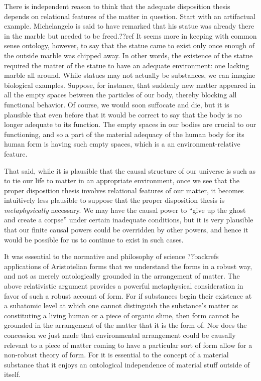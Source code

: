 There is independent reason to think that the adequate disposition thesis depends on relational features of the matter in 
question. Start with an artifactual example. Michelangelo is said to have remarked that his statue was already there in the 
marble but needed to be freed.??ref It seems more in keeping with common sense ontology, however, to say that the statue came 
to exist only once enough of the outside marble was chipped away. In other words, the existence of the statue required the 
matter of the statue to have an adequate environment: one lacking marble all around. While statues may not actually be substances,
we can imagine biological examples. Suppose, for instance, that suddenly new matter appeared in all the empty spaces between the particles of our body, thereby blocking all functional behavior. Of course, we would soon suffocate and die, but it is plausible
that even before that it would be correct to say that the body is no longer adequate to its function. The empty spaces
in our bodies are crucial to our functioning, and so a part of the material adequacy of the human body for its human form 
is having such empty spaces, which is a an environment-relative feature.

That said, while it is plausible that the causal structure of our universe is such as to tie our life to matter in an
appropriate environment, once we see that the proper disposition thesis involves relational features of our matter, it 
becomes intuitively less plausible to suppose that the proper disposition thesis is \textit{metaphysically} necessary. We may have 
the causal power to ``give up the ghost and create a corpse'' under certain inadequate conditions, but it is very plausible
that our finite causal powers could be overridden by other powers, and hence it would be possible for us to continue to 
exist in such cases. 

It was essential to the normative and philosophy of science ??backrefs applications of Aristotelian forms that we understand
the forms in a robust way, and not as merely ontologically grounded in the arrangement of matter. The above relativistic argument provides a powerful metaphysical consideration in favor of such a robust account of form. For if substances begin their existence
at a subatomic level at which one cannot distinguish the substance's matter as constituting a living human or a piece of organic
slime, then form cannot be grounded in the arrangement of the matter that it is the form of. Nor does the concession we just 
made that environmental arrangement could be causally relevant to a piece of matter coming to have a particular sort of form 
allow for a non-robust theory of form. For it is essential to the concept of a material substance that it enjoys an ontological 
independence of material stuff outside of itself. 

